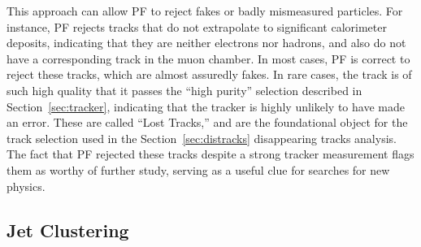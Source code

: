   This approach can allow PF to reject fakes or badly mismeasured particles.
  For instance, PF rejects tracks that do not extrapolate to significant calorimeter deposits, indicating that they are neither electrons nor hadrons, and also do not have a corresponding track in the muon chamber.
  In most cases, PF is correct to reject these tracks, which are almost assuredly fakes.
  In rare cases, the track is of such high quality that it passes the ``high purity'' selection described in Section~\ref{sec:tracker}, indicating that the tracker is highly unlikely to have made an error.
  These are called ``Lost Tracks,'' and are the foundational object for the track selection used in the Section~\ref{sec:distracks} disappearing tracks analysis.
  The fact that PF rejected these tracks despite a strong tracker measurement flags them as worthy of further study, serving as a useful clue for searches for new physics.
  
  \subsection{Jet Clustering} \label{sec:jetclustering}

